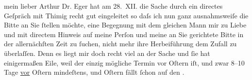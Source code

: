 \pstart{}mein lieber Arthur\pend\vspace{0.5em}
\pstart
           Dr. Eger hat am 28. XII. die
               Sache durch ein directes Geſpräch mit Thimig
               recht gut eingeleitet so daſs ich nun ganz ausnahmsweiſe die  Bitte an Sie{ }ſtellen möchte, eine Begegnung mit
               dem gleichen Mann mir zu Liebe und mit directem Hinweis auf meine Perſon und meine an
               Sie gerichtete Bitte in der allernächſten Zeit zu{ }ſuchen, nicht mehr ihre
               Herbeiführung dem Zufall zu überlaſſen. Denn es liegt mir doch recht viel an der
               Sache und{ }ſie hat einigermaßen Eile, weil der einzig mögliche Termin vor
                  Oſtern iſt, und zwar 8–10 Tage \uline{vor}{ }Oſtern mindeſtens, und Oſtern fällt{ }ſchon auf den \label{K_L02112-1v}\label{K_L02112-1}.\pend
           
